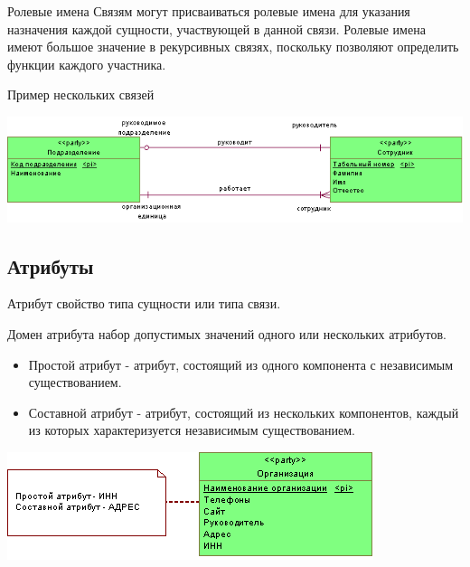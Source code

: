 \documentclass{beamer}
\begin{document}
\begin{frame}
\begin{block}{Ролевые имена}
Связям могут присваиваться ролевые имена для указания назначения каждой
сущности, участвующей в данной связи. Ролевые имена имеют большое значение в
рекурсивных связях, поскольку позволяют определить функции каждого участника.
\end{block}
\begin{block}{Пример нескольких связей}
\begin{center}
\includegraphics[scale=0.6]{images/role-01.png}
\end{center}
\end{block}
\end{frame}

\subsection{Атрибуты}
\begin{frame}
\begin{block}{Атрибут}
свойство типа сущности или типа связи.
\end{block}
\begin{block}{Домен атрибута}
набор допустимых значений одного или нескольких атрибутов.
\end{block}
\begin{itemize}
\item Простой атрибут - атрибут, состоящий из одного компонента с независимым существованием.
\item Составной атрибут - атрибут, состоящий из нескольких компонентов, каждый из которых характеризуется независимым существованием.
\end{itemize}
\begin{center}
\includegraphics[scale=0.6]{images/simple-attr.png}
\end{center}
\end{frame}
\end{document}
